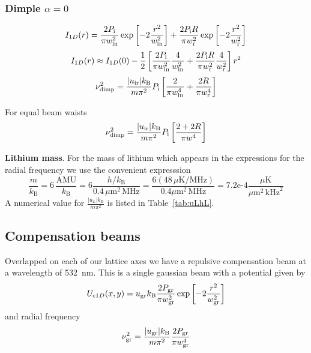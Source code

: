 \subsubsection{Dimple $\alpha=0$}

\begin{equation}
 I_{1D}(r) = 
  \frac{2  P_{\text{i}}}{\pi  w_{\text{in}}^{2}} 
  \exp\left[ -2 \frac{r^{2}}{ w_{\text{in}}^{2}} \right] 
 +\frac{2  P_{\text{i}} R}{\pi  w_{\text{r}}^{2}} 
  \exp\left[ -2 \frac{r^{2}}{ w_{\text{r}}^{2}} \right]
\end{equation}
\begin{equation}
I_{1D}(r) \approx I_{1D}(0)  - \frac{1}{2} 
  \left[ 
  \frac{2  P_{\text{i}}}{\pi  w_{\text{in}}^{2}} \frac{4}{ w_{\text{in}}^{2}} 
  + 
  \frac{2  P_{\text{i}} R}{\pi  w_{\text{r}}^{2}} \frac{4}{ w_{\text{r}}^{2}} 
\right] r^{2}
\end{equation}
\begin{equation}
 \nu_{\text{dimp}}^{2} 	= \frac{ |u_{\text{ir}}| k_{\text{B}}   }{m\pi^{2}}
  P_{\text{i}}  \left[ 
  \frac{2}{\pi  w_{\text{in}}^{4}} 
  + 
  \frac{2 R}{\pi  w_{\text{r}}^{4}} 
\right]
\end{equation}

For equal beam waists 
\begin{equation}
 \nu_{\text{dimp}}^{2} 	= \frac{ |u_{\text{ir}}| k_{\text{B}}   }{m\pi^{2}}
  P_{\text{i}}  \left[ 
  \frac{2+2R}{\pi w^{4}} 
\right]
\end{equation}


\textbf{Lithium mass}. 
For the mass of lithium which appears in the expressions for the radial
frequency we use the convenient expresssion 
\begin{equation}
  \frac{m}{ k_{\text{B}}}  = 6\,\frac{ \text{AMU} }{ k_{\text{B}}} 
    =  6 \frac{  h/k_{\text{B}} }{ 0.4 \,\mu\text{m}^{2}\,\text{MHz} }
   =  \frac{ 6  ( 48 \, \mu\text{K} / \text{MHz} ) }{ 0.4 \mu\text{m}^{2} \,\text{MHz} }  
    =  7.2\text{e-4}
    \frac { \mu\text{K} }{  \mu\text{m}^{2}\, \text{kHz}^{2} } 
\end{equation}
A numerical value for $\frac{ |u_{L}| k_{\text{B}} } { m \pi^{2}}$ is listed in
Table~\ref{tab:uLhL}.   
 

\subsection{Compensation beams}

Overlapped on each of our lattice axes we have a repulsive compensation beam at
a wavelength of 532~nm.  This is a single gaussian beam with a potential given
by  
\begin{equation}
  U_{\text{c}1D}( x,y) =   u_{\text{gr}}k_{\text{B}} \frac{2 P_{\text{gr}} }{\pi  w_{\text{gr}}^{2}} 
  \exp\left[ - 2 \frac{r^{2}}{  w_{\text{gr}}^{2}} \right] 
\end{equation}
and radial frequency
\begin{equation}
  \nu_{\text{gr}}^{2} =  
   \frac{ |u_{\text{gr}}| k_{\text{B}}   }{m\pi^{2}}
  \frac{2  P_{\text{gr}}}{\pi  w_{\text{gr}}^{4}} 
\end{equation}

